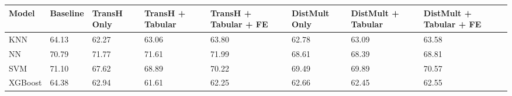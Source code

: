 \begin{tabular}{llllllll}
\toprule
Model & Baseline & TransH Only & TransH + Tabular & TransH + Tabular + FE & DistMult Only & DistMult + Tabular & DistMult + Tabular + FE \\
\midrule
KNN & 64.13 & 62.27 & 63.06 & 63.80 & 62.78 & 63.09 & 63.58 \\
NN & 70.79 & 71.77 & 71.61 & 71.99 & 68.61 & 68.39 & 68.81 \\
SVM & 71.10 & 67.62 & 68.89 & 70.22 & 69.49 & 69.89 & 70.57 \\
XGBoost & 64.38 & 62.94 & 61.61 & 62.25 & 62.66 & 62.45 & 62.55 \\
\bottomrule
\end{tabular}
